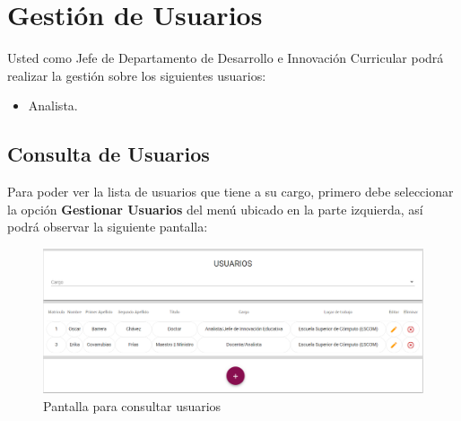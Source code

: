 
\section{Gestión de Usuarios}

    Usted como Jefe de Departamento de Desarrollo e Innovación Curricular podrá realizar la gestión sobre los siguientes usuarios:
    \begin{itemize}
        \item Analista.
    \end{itemize}


    \subsection{Consulta de Usuarios}

        Para poder ver la lista de usuarios que tiene a su cargo, primero debe seleccionar la opción \textbf{Gestionar Usuarios} del menú ubicado en la parte izquierda, así podrá observar la siguiente pantalla:

        \begin{figure}[H]
            \centering
            \hypertarget{consultarUs}{\includegraphics[width=0.7\linewidth]{images/SP5/Consultar-Usuario}}
            \caption{Pantalla para consultar usuarios}
            \label{consultarrh}
        \end{figure}

